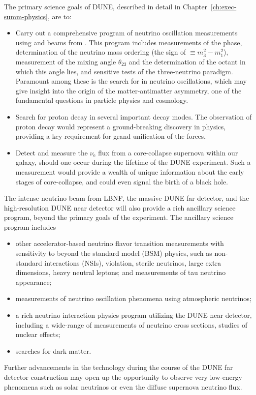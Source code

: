 The primary science goals of DUNE, described in detail in Chapter~\ref{ch:exec-summ-physics}, are to: 
\begin{itemize}

\item Carry out a comprehensive program of neutrino oscillation measurements using \numu and \anumu beams from \fnal. This program includes measurements of the  phase, determination of the neutrino mass ordering (the sign of $ \equiv m_3^2-m_1^2$), measurement of the mixing angle $\theta_{23}$ and the determination of the octant in which this angle lies,
and sensitive tests of the three-neutrino paradigm. Paramount among these is the search for  in neutrino oscillations, which may give insight into the origin of the matter-antimatter asymmetry, one of the fundamental questions in particle physics and cosmology. 

\item Search for proton decay in several important decay modes. The observation of proton decay would represent a ground-breaking discovery in physics, providing a key requirement for grand unification of the forces. 

    \item Detect and measure the $\nu_\text{e}$ flux from a core-collapse supernova within our galaxy, should one occur during the lifetime of the DUNE experiment. Such a measurement would provide a wealth of unique information about the early stages of core-collapse, and could even signal the birth of a black hole.
    
\end{itemize}

The intense neutrino beam from LBNF, the massive DUNE \lartpc far detector, and the high-resolution
DUNE near detector will also provide a rich ancillary science program, beyond the primary goals of the experiment. The ancillary science program includes
\begin{itemize}
     \item other accelerator-based neutrino flavor transition measurements with sensitivity to beyond the standard model (BSM) physics, such as non-standard interactions (NSIs),  violation, sterile neutrinos, large extra dimensions, heavy neutral leptons;
 and measurements of tau neutrino appearance;
     \item measurements of neutrino oscillation phenomena using atmospheric neutrinos;
     \item a rich neutrino interaction physics program utilizing the DUNE near detector, including a wide-range of measurements of neutrino cross sections, studies of nuclear effects; %
     \item  searches for dark matter.
\end{itemize} 
Further advancements in the \lartpc %
technology during the course of the DUNE far detector construction may open up the opportunity
to observe very low-energy phenomena such as solar neutrinos or even the diffuse supernova neutrino flux.


